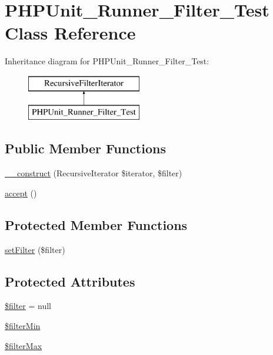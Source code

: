 \hypertarget{class_p_h_p_unit___runner___filter___test}{}\section{P\+H\+P\+Unit\+\_\+\+Runner\+\_\+\+Filter\+\_\+\+Test Class Reference}
\label{class_p_h_p_unit___runner___filter___test}
Inheritance diagram for P\+H\+P\+Unit\+\_\+\+Runner\+\_\+\+Filter\+\_\+\+Test\+:\begin{figure}[H]
\begin{center}
\leavevmode
\includegraphics[height=2.000000cm]{class_p_h_p_unit___runner___filter___test}
\end{center}
\end{figure}
\subsection*{Public Member Functions}
\begin{DoxyCompactItemize}
\item 
\mbox{\hyperlink{class_p_h_p_unit___runner___filter___test_aefd0b19f0f2f84cc488d9ef6ffd04390}{\+\_\+\+\_\+construct}} (Recursive\+Iterator \$iterator, \$filter)
\item 
\mbox{\hyperlink{class_p_h_p_unit___runner___filter___test_acb64affba32059c09533892d9ded224a}{accept}} ()
\end{DoxyCompactItemize}
\subsection*{Protected Member Functions}
\begin{DoxyCompactItemize}
\item 
\mbox{\hyperlink{class_p_h_p_unit___runner___filter___test_a605c2741a307b88709684878228fecf0}{set\+Filter}} (\$filter)
\end{DoxyCompactItemize}
\subsection*{Protected Attributes}
\begin{DoxyCompactItemize}
\item 
\mbox{\hyperlink{class_p_h_p_unit___runner___filter___test_aac53bdb48bdd96ff9c20e2a86f48ce5f}{\$filter}} = null
\item 
\mbox{\hyperlink{class_p_h_p_unit___runner___filter___test_aa5ca8169a9cc9ae393c32937f299ef24}{\$filter\+Min}}
\item 
\mbox{\hyperlink{class_p_h_p_unit___runner___filter___test_a6100e27b99e25ee239180e88ddb215e7}{\$filter\+Max}}
\end{DoxyCompactItemize}


